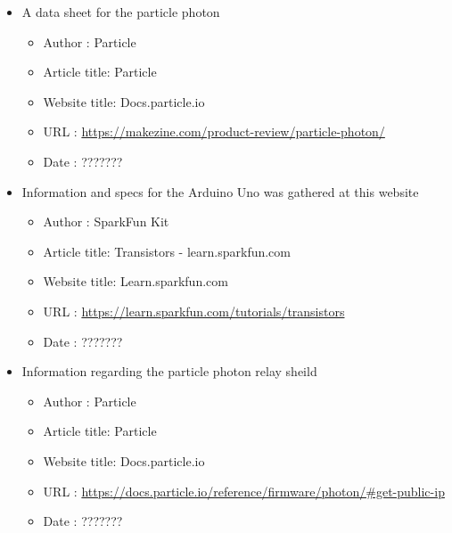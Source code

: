 \documentclass{article}
\begin{document}
\begin{thebibliography}{56}
\begin{itemize}
        \item A data sheet for the particle photon
        \begin{itemize}
            \item Author       : Particle
            \item Article title: Particle
            \item Website title: Docs.particle.io
            \item URL          : \url{https://makezine.com/product-review/particle-photon/}
            \item Date         : ???????
        \end{itemize}
    \end{itemize}

    \begin{itemize}
        \item Information and specs for the Arduino Uno was gathered at this website
        \begin{itemize}
            \item Author       : SparkFun Kit
            \item Article title: Transistors - learn.sparkfun.com
            \item Website title: Learn.sparkfun.com
            \item URL          : \url{https://learn.sparkfun.com/tutorials/transistors}
            \item Date         : ???????
        \end{itemize}
    \end{itemize}

    \begin{itemize}
        \item Information regarding the particle photon relay sheild
        \begin{itemize}
            \item Author       : Particle
            \item Article title: Particle
            \item Website title: Docs.particle.io
            \item URL          : \url{https://docs.particle.io/reference/firmware/photon/#get-public-ip}
            \item Date         : ???????
        \end{itemize}
    \end{itemize}


\end{thebibliography}
\end{document}
